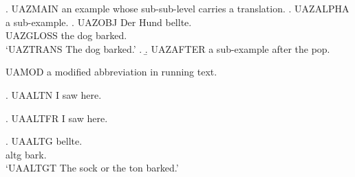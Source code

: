 \ex. UAZMAIN an example whose sub-sub-level carries a translation.
\a. UAZALPHA a sub-example.
\a. \gll UAZOBJ Der Hund bellte.\\
        UAZGLOSS the dog barked.\\
\glt `UAZTRANS The dog barked.'
\z.
\b. UAZAFTER a sub-example after the pop.

UAMOD a modified abbreviation  in running text.

\ex. UAALTN I saw  here.

{
\ex. UAALTFR I saw  here.}

\exg. UAALTG  bellte.\\
      altg  bark.\\
\glt `UAALTGT The sock or the ton barked.'

